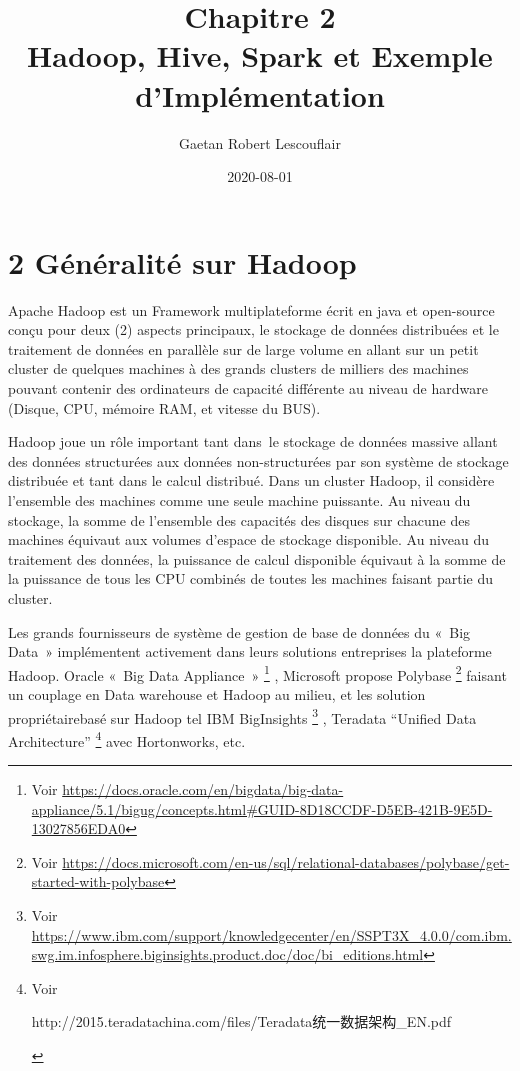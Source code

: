 \documentclass[12pt,french]{book}
\title{
	Chapitre 2\\
	Hadoop, Hive, Spark et Exemple d'Implémentation}
\date{2020-08-01}
\author{Gaetan Robert Lescouflair}
\begin{document}
	\maketitle
	\newpage
	\setcounter{chapter}{2}
	\setcounter{secnumdepth}{3}	
	\section*{2 Généralité sur Hadoop}

Apache Hadoop est un Framework multiplateforme écrit en java et open-source conçu pour deux (2) aspects principaux, le stockage de données distribuées et le traitement de données en parallèle sur de large volume en allant sur un petit cluster de quelques machines à des grands clusters de milliers des machines pouvant contenir des ordinateurs de capacité différente au niveau de hardware (Disque, CPU, mémoire RAM, et vitesse du BUS).
 
Hadoop joue un rôle important tant dans le stockage de données massive allant des données structurées aux données non-structurées par son système de stockage distribuée et tant dans le calcul distribué.
Dans un cluster Hadoop, il considère l’ensemble des machines comme une seule machine puissante.
Au niveau du stockage, la somme de l’ensemble des capacités des disques sur chacune des machines équivaut aux volumes d’espace de stockage disponible.
Au niveau du traitement des données, la puissance de calcul disponible équivaut à la somme de la puissance de tous les CPU combinés de toutes les machines faisant partie du cluster.

Les grands fournisseurs de système de gestion de base de données du « Big Data » implémentent activement dans leurs solutions entreprises la plateforme Hadoop.
Oracle « Big Data Appliance »
	\footnote{Voir \url{https://docs.oracle.com/en/bigdata/big-data-appliance/5.1/bigug/concepts.html\#GUID-8D18CCDF-D5EB-421B-9E5D-13027856EDA0}}
, Microsoft propose Polybase 
	\footnote{Voir \url{https://docs.microsoft.com/en-us/sql/relational-databases/polybase/get-started-with-polybase}}
faisant un couplage en Data warehouse et Hadoop au milieu, et les solution propriétairebasé sur Hadoop tel IBM BigInsights 
	\footnote{Voir \url{https://www.ibm.com/support/knowledgecenter/en/SSPT3X\_4.0.0/com.ibm.swg.im.infosphere.biginsights.product.doc/doc/bi\_editions.html}}
, Teradata “Unified Data Architecture” 
	\footnote{Voir 
		\begin{CJK*}{UTF8}{gbsn}
			http://2015.teradatachina.com/files/Teradata统一数据架构\_EN.pdf
		\end{CJK*}
	}
avec Hortonworks, etc.
\end{document}
